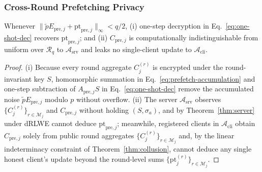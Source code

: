 \subsubsection{Cross-Round Prefetching Privacy}
\begin{theorem}
\label{thm:prefetch}
Whenever $\|\tilde{p} E_{\mathrm{pre},j} + \mathrm{pt}_{\mathrm{pre},j}\|_\infty < q/2$, (i) one-step decryption in Eq.~\eqref{eq:one-shot-dec} recovers $\mathrm{pt}_{\mathrm{pre},j}$; and (ii) $C_{\mathrm{pre},j}$ is computationally indistinguishable from uniform over $\mathcal{R}_q$ to $\mathcal{A}_{\mathrm{srv}}$ and leaks no single-client update to $\mathcal{A}_{\mathrm{cli}}$.
\end{theorem}
\begin{proof}
(i) Because every round aggregate $C_j^{(r)}$ is encrypted under the round-invariant key $S$, homomorphic summation in Eq.~\eqref{eq:prefetch-accumulation} and one-step subtraction of $A_{\mathrm{pre},j}S$ in Eq.~\eqref{eq:one-shot-dec} remove the accumulated noise $\tilde{p}E_{\mathrm{pre},j}$ modulo $p$ without overflow. (ii) The server $\mathcal{A}_{\mathrm{srv}}$ observes $\{C_j^{(r)}\}_{r \in \mathcal{M}_j}$ and $C_{\mathrm{pre},j}$ without holding $(S, \sigma_a)$, and by Theorem~\ref{thm:server} under dRLWE cannot deduce $\mathrm{pt}_{\mathrm{pre},j}$; meanwhile, registered clients in $\mathcal{A}_{\mathrm{cli}}$ obtain $C_{\mathrm{pre},j}$ solely from public round aggregates $\{C_j^{(r)}\}_{r \in \mathcal{M}_j}$ and, by the linear indeterminacy constraint of Theorem~\ref{thm:collusion}, cannot deduce any single honest client's update beyond the round-level sums $\{\mathrm{pt}_j^{(r)}\}_{r \in \mathcal{M}_j}$.
\end{proof}

